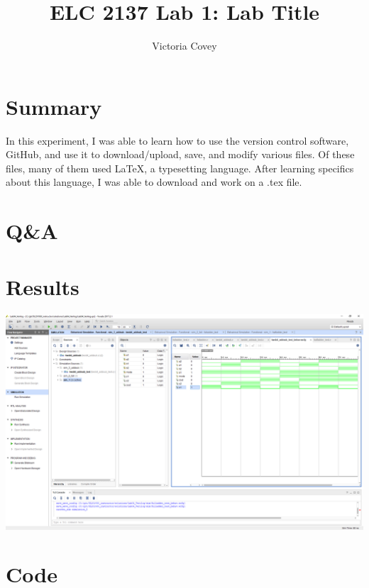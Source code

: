 \documentclass[11pt]{article}
\newcommand{\Verilog}[2][]{%
	
}
\begin{document}
\title{ELC 2137 Lab 1: Lab Title}
\author{Victoria Covey}

\maketitle


\section*{Summary}

In this experiment, I was able to learn how to use the version control software, GitHub, and use it to download/upload, save, and modify various files. Of these files, many of them used LaTeX, a typesetting language. After learning specifics about this language, I was able to download and work on a .tex file.


\section*{Q\&A}

\section*{Results}

\includegraphics[width=01\textwidth,trim=19cm 15.5cm 0.6cm 4cm,clip]{lab1_example_screenshot}


\section*{Code}

\Verilog[caption=File-included example code,label=code:file_ex]{lab1_example_code.sv}
\end{document}
